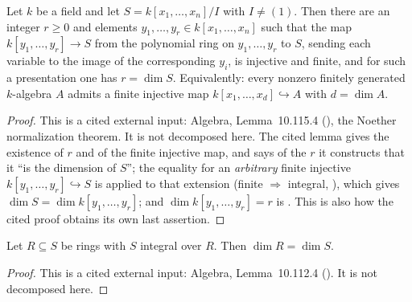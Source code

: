 \begin{lemma}
\label{lem:pcb-noether-normalization}
Let \(k\) be a field and let \(S=k[x_1,\dots,x_n]/I\) with
\(I\neq(1)\).  Then there are an integer \(r\geq0\) and elements
\(y_1,\dots,y_r\in k[x_1,\dots,x_n]\) such that the map
\(k[y_1,\dots,y_r]\to S\) from the polynomial ring on
\(y_1,\dots,y_r\) to \(S\), sending each variable to the image of the
corresponding \(y_i\), is injective and finite, and for such a
presentation one has \(r=\dim S\).  Equivalently: every
nonzero finitely generated \(k\)-algebra \(A\) admits a finite
injective map \(k[x_1,\dots,x_d]\hookrightarrow A\) with
\(d=\dim A\).
\end{lemma}
\begin{proof}
This is a cited external input: Algebra, Lemma~10.115.4
(), the Noether normalization theorem.  It is not
decomposed here.  The cited lemma gives the existence of \(r\) and of
the finite injective map, and says of the \(r\) it constructs that it
``is the dimension of \(S\)''; the equality for an \emph{arbitrary}
finite injective \(k[y_1,\dots,y_r]\hookrightarrow S\) is
 applied to that extension (finite
\(\Rightarrow\) integral, ), which
gives \(\dim S=\dim k[y_1,\dots,y_r]\); and
\(\dim k[y_1,\dots,y_r]=r\) is
.  This is also how the cited
proof obtains its own last assertion.
\end{proof}

\begin{lemma}
\label{lem:pcb-integral-dimension}
Let \(R\subseteq S\) be rings with \(S\) integral over \(R\).  Then
\(\dim R=\dim S\).
\end{lemma}
\begin{proof}
This is a cited external input: Algebra, Lemma~10.112.4
().  It is not decomposed here.
\end{proof}

